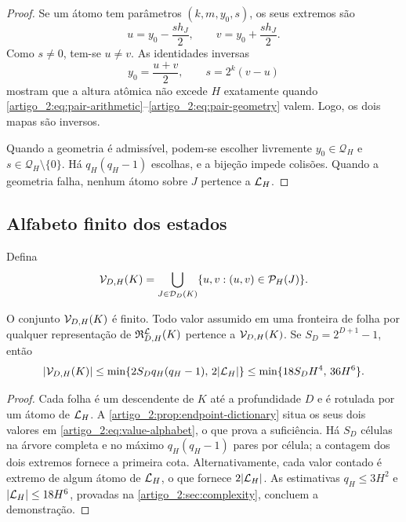 \begin{proof}
Se um átomo tem parâmetros $(k,m,y_0,s)$, os seus extremos são
\[
 u=y_0-\frac{s h_J}{2},\qquad
 v=y_0+\frac{s h_J}{2}.
\]
Como $s\ne0$, tem-se $u\ne v$. As identidades inversas
\[
 y_0=\frac{u+v}{2},\qquad s=2^k(v-u)
\]
mostram que a altura atômica não excede $H$ exatamente quando
\eqref{artigo_2:eq:pair-arithmetic}--\eqref{artigo_2:eq:pair-geometry} valem. Logo, os dois
mapas são inversos.

Quando a geometria é admissível, podem-se escolher livremente
$y_0\in\mathcal Q_H$ e $s\in\mathcal Q_H\setminus\{0\}$. Há
$q_H(q_H-1)$ escolhas, e a bijeção impede colisões. Quando a geometria falha,
nenhum átomo sobre $J$ pertence a $\mathcal{L}_H$.
\end{proof}

\subsection{Alfabeto finito dos estados}

\begin{definition}\label{map:artigo_2:4.3}
\label{artigo_2:def:value-alphabet}
Defina
\begin{equation}
 \mathcal{V}_{D,H}(K)
 =\bigcup_{J\in\mathcal D_D(K)}
 \{u,v:(u,v)\in\mathcal{P}_H(J)\}.
 \label{artigo_2:eq:value-alphabet}
\end{equation}
\end{definition}

\begin{lemma}\label{map:artigo_2:4.4}
\label{artigo_2:lem:value-alphabet}
O conjunto $\mathcal{V}_{D,H}(K)$ é finito. Todo valor assumido em uma fronteira
de folha por qualquer representação de
$\mathfrak{R}_{D,H}^{\mathcal{L}}(K)$ pertence a
$\mathcal{V}_{D,H}(K)$. Se $S_D=2^{D+1}-1$, então
\begin{equation}
 |\mathcal{V}_{D,H}(K)|
 \le \min\{2S_Dq_H(q_H-1),\,2|\mathcal{L}_H|\}
 \le \min\{18S_DH^4,\,36H^6\}.
 \label{artigo_2:eq:value-alphabet-bound}
\end{equation}
\end{lemma}

\begin{proof}
Cada folha é um descendente de $K$ até a profundidade $D$ e é rotulada por um
átomo de $\mathcal{L}_H$. A \cref{artigo_2:prop:endpoint-dictionary} situa os seus dois
valores em \eqref{artigo_2:eq:value-alphabet}, o que prova a suficiência. Há $S_D$ células
na árvore completa e no máximo $q_H(q_H-1)$ pares por célula; a contagem dos dois
extremos fornece a primeira cota. Alternativamente, cada valor contado é extremo
de algum átomo de $\mathcal{L}_H$, o que fornece $2|\mathcal{L}_H|$. As estimativas
$q_H\le3H^2$ e $|\mathcal{L}_H|\le18H^6$, provadas na \cref{artigo_2:sec:complexity},
concluem a demonstração.
\end{proof}

